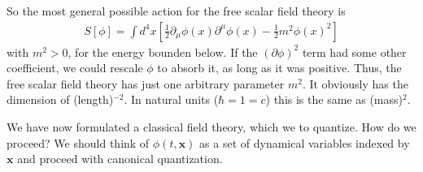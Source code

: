 \documentclass{article}
\begin{document}
So the most general possible action for the free scalar field theory is
\begin{align}
S[\phi]=\int d^4x\left[\frac{1}{2}\partial_\mu\phi(x)\partial^\mu\phi(x)-\frac{1}{2}m^2\phi(x)^2\right]
\end{align}
with $m^2>0$, for the energy bounden below. If the $(\partial\phi)^2$ term had some other coefficient, we could rescale $\phi$ to absorb it, as long as it was positive. Thus, the free scalar field theory has just one arbitrary parameter $m^2$. It obviously has the dimension of (length)$^{-2}$. In natural units ($\hbar=1=c$) this is the same as (mass)$^2$.

We have now formulated a classical field theory, which we to quantize. How do we proceed? We should think of $\phi(t,\mathbf{x})$ as a set of dynamical variables indexed by $\mathbf{x}$ and proceed with canonical quantization.
\end{document}
